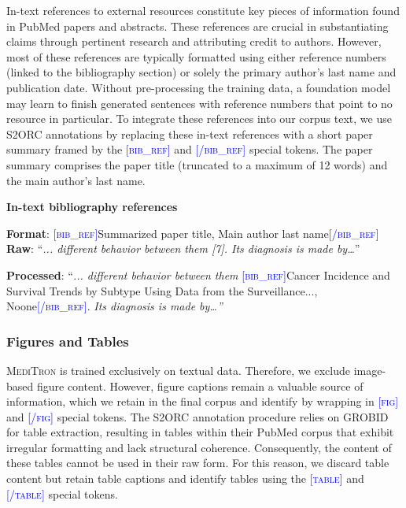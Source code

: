 \documentclass{article}
\newcommand{\mtron}{\textsc{MediTron}\xspace}
\begin{document}
In-text references to external resources constitute key pieces of information found in PubMed papers and abstracts. These references are crucial in substantiating claims through pertinent research and attributing credit to authors. However, most of these references are typically formatted using either reference numbers (linked to the bibliography section) or solely the primary author's last name and publication date. Without pre-processing the training data, a foundation model may learn to finish generated sentences with reference numbers that point to no resource in particular. To integrate these references into our corpus text, we use S2ORC annotations by replacing these in-text references with a short paper summary framed by the \textsc{\textcolor{blue}{[bib\_ref]}} and \textsc{\textcolor{blue}{[/bib\_ref]}} special tokens. The paper summary comprises the paper title (truncated to a maximum of 12 words) and the main author's last name. 

\begin{myboxnote}[]
\begin{center}
\textbf{In-text bibliography references}
\end{center} 

\textbf{Format}: \textsc{\textcolor{blue}{[bib\_ref]}}{Summarized paper title, Main author last name}\textsc{\textcolor{blue}{[/bib\_ref]}}\\

\textbf{Raw}: 
“\textit{... different behavior between them [7]. Its diagnosis is made by…}”

\textbf{Processed}:
“\textit{... different behavior between them} \textsc{\textcolor{blue}{[bib\_ref]}}{Cancer Incidence and Survival Trends by Subtype Using Data from the Surveillance..., Noone}\textsc{\textcolor{blue}{[/bib\_ref]}}. \textit{Its diagnosis is made by…”}
\end{myboxnote}


\subsubsection{Figures and Tables}

\mtron is trained exclusively on textual data. Therefore, we exclude image-based figure content. However, figure captions remain a valuable source of information, which we retain in the final corpus and identify by wrapping in \textsc{\textcolor{blue}{[fig]}} and \textsc{\textcolor{blue}{[/fig]}} special tokens. The S2ORC annotation procedure relies on GROBID for table extraction, resulting in tables within their PubMed corpus that exhibit irregular formatting and lack structural coherence. Consequently, the content of these tables cannot be used in their raw form. For this reason, we discard table content but retain table captions and identify tables using the \textsc{\textcolor{blue}{[table]}} and \textsc{\textcolor{blue}{[/table]}} special tokens. 
\end{document}
